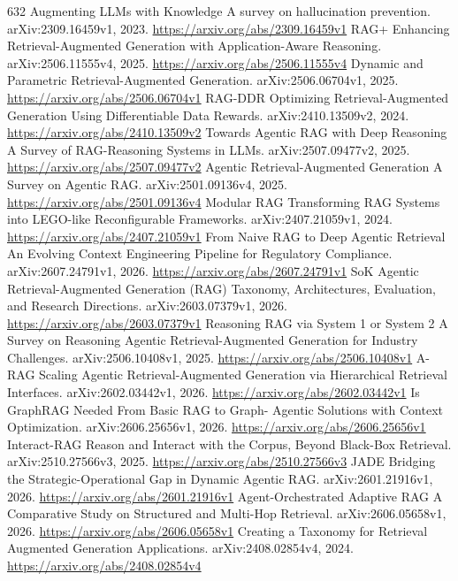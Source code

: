 \documentclass[11pt]{article}
\begin{document}
\begin{thebibliography}{632}
 Augmenting LLMs with Knowledge A survey on hallucination prevention. arXiv:2309.16459v1, 2023. \url{https://arxiv.org/abs/2309.16459v1}
 RAG+ Enhancing Retrieval-Augmented Generation with Application-Aware Reasoning. arXiv:2506.11555v4, 2025. \url{https://arxiv.org/abs/2506.11555v4}
 Dynamic and Parametric Retrieval-Augmented Generation. arXiv:2506.06704v1, 2025. \url{https://arxiv.org/abs/2506.06704v1}
 RAG-DDR Optimizing Retrieval-Augmented Generation Using Differentiable Data Rewards. arXiv:2410.13509v2, 2024. \url{https://arxiv.org/abs/2410.13509v2}
 Towards Agentic RAG with Deep Reasoning A Survey of RAG-Reasoning Systems in LLMs. arXiv:2507.09477v2, 2025. \url{https://arxiv.org/abs/2507.09477v2}
 Agentic Retrieval-Augmented Generation A Survey on Agentic RAG. arXiv:2501.09136v4, 2025. \url{https://arxiv.org/abs/2501.09136v4}
 Modular RAG Transforming RAG Systems into LEGO-like Reconfigurable Frameworks. arXiv:2407.21059v1, 2024. \url{https://arxiv.org/abs/2407.21059v1}
 From Naive RAG to Deep Agentic Retrieval An Evolving Context Engineering Pipeline for Regulatory Compliance. arXiv:2607.24791v1, 2026. \url{https://arxiv.org/abs/2607.24791v1}
 SoK Agentic Retrieval-Augmented Generation (RAG) Taxonomy, Architectures, Evaluation, and Research Directions. arXiv:2603.07379v1, 2026. \url{https://arxiv.org/abs/2603.07379v1}
 Reasoning RAG via System 1 or System 2 A Survey on Reasoning Agentic Retrieval-Augmented Generation for Industry Challenges. arXiv:2506.10408v1, 2025. \url{https://arxiv.org/abs/2506.10408v1}
 A-RAG Scaling Agentic Retrieval-Augmented Generation via Hierarchical Retrieval Interfaces. arXiv:2602.03442v1, 2026. \url{https://arxiv.org/abs/2602.03442v1}
 Is GraphRAG Needed From Basic RAG to Graph- Agentic Solutions with Context Optimization. arXiv:2606.25656v1, 2026. \url{https://arxiv.org/abs/2606.25656v1}
 Interact-RAG Reason and Interact with the Corpus, Beyond Black-Box Retrieval. arXiv:2510.27566v3, 2025. \url{https://arxiv.org/abs/2510.27566v3}
 JADE Bridging the Strategic-Operational Gap in Dynamic Agentic RAG. arXiv:2601.21916v1, 2026. \url{https://arxiv.org/abs/2601.21916v1}
 Agent-Orchestrated Adaptive RAG A Comparative Study on Structured and Multi-Hop Retrieval. arXiv:2606.05658v1, 2026. \url{https://arxiv.org/abs/2606.05658v1}
 Creating a Taxonomy for Retrieval Augmented Generation Applications. arXiv:2408.02854v4, 2024. \url{https://arxiv.org/abs/2408.02854v4}

\end{thebibliography}
\end{document}
